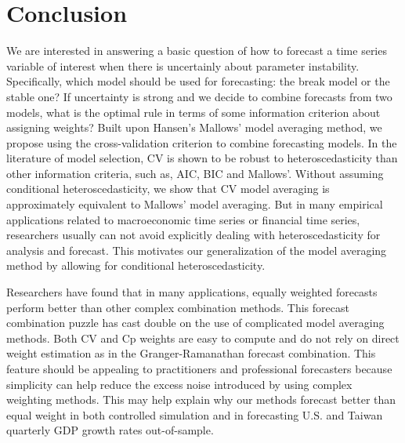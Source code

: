 \section{Conclusion}
We are interested in answering a basic question of how to forecast a time series variable of interest when there is uncertainly about parameter instability. Specifically, which model should be used for forecasting: the break model or the stable one? If uncertainty is strong and we decide to combine forecasts from two models, what is the optimal rule in terms of some information criterion about assigning weights? Built upon Hansen's Mallows' model averaging method, we propose using the cross-validation criterion to combine forecasting models. In the literature of model selection, CV is shown to be robust to heteroscedasticity than other information criteria, such as, AIC, BIC and Mallows'. Without assuming conditional heteroscedasticity, we show that CV model averaging is approximately equivalent to Mallows' model averaging. But in many empirical applications related to macroeconomic time series or financial time series, researchers usually can not avoid explicitly dealing with heteroscedasticity for analysis and forecast. This motivates our generalization of the model averaging method by allowing for conditional heteroscedasticity.

Researchers have found that in many applications, equally weighted forecasts perform better than other complex combination methods. This forecast combination puzzle has cast double on the use of complicated model averaging methods. Both CV and Cp weights are easy to compute and do not rely on direct weight estimation as in the Granger-Ramanathan forecast combination. This feature should be appealing to practitioners and professional forecasters because simplicity can help reduce the excess noise introduced by using complex weighting methods. This may help explain why our methods forecast better than equal weight in both controlled simulation and in forecasting U.S. and Taiwan quarterly GDP growth rates out-of-sample.

